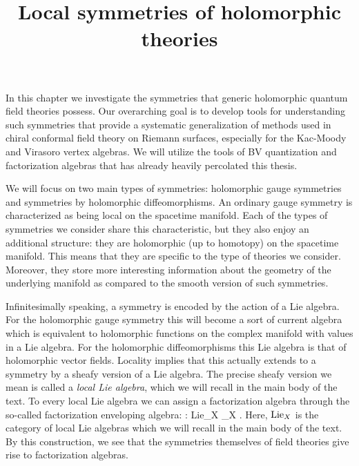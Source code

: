 \documentclass[10pt]{amsart}
\title{Local symmetries of holomorphic theories}
\begin{document}
\maketitle
\tableofcontents



In this chapter we investigate the symmetries that generic holomorphic quantum field theories possess.
Our overarching goal is to develop tools for understanding such symmetries that provide a systematic generalization of methods used in chiral conformal field theory on Riemann surfaces, especially for the Kac-Moody and Virasoro vertex algebras.
We will utilize the tools of BV quantization and factorization algebras that has already heavily percolated this thesis.

We will focus on two main types of symmetries: holomorphic gauge symmetries and symmetries by holomorphic diffeomorphisms. 
An ordinary gauge symmetry is characterized as being local on the spacetime manifold. 
Each of the types of symmetries we consider share this characteristic, but they also enjoy an additional structure: they are holomorphic (up to homotopy) on the spacetime manifold. 
This means that they are specific to the type of theories we consider.
Moreover, they store more interesting information about the geometry of the underlying manifold as compared to the smooth version of such symmetries.

Infinitesimally speaking, a symmetry is encoded by the action of a Lie algebra.
For the holomorphic gauge symmetry this will become a sort of current algebra which is equivalent to holomorphic functions on the complex manifold with values in a Lie algebra.
For the holomorphic diffeomorphisms this Lie algebra is that of holomorphic vector fields.
Locality implies that this actually extends to a symmetry by a sheafy version of a Lie algebra. 
The precise sheafy version we mean is called a {\em local Lie algebra}, which we will recall in the main body of the text. 
To every local Lie algebra we can assign a factorization algebra through the so-called factorization enveloping algebra:
\ben
{} : {\rm Lie}_X _X .
\een
Here, ${\rm Lie}_X$ is the category of local Lie algebras which we will recall in the main body of the text.
By this construction, we see that the symmetries themselves of field theories give rise to factorization algebras. 
\end{document}
